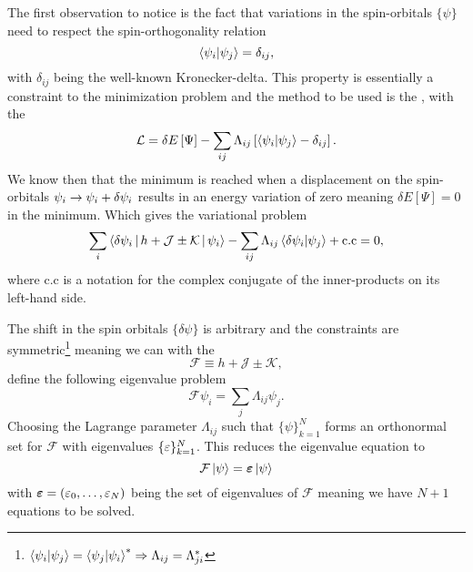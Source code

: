         The first observation to notice is the fact that variations in the
        spin-orbitals $\{\psi\}$ need to respect the spin-orthogonality
        relation
            \begin{equation}
                \braket{\psi_i}{\psi_j} = \delta_{ij},
            \end{equation}
        with $\delta_{ij}$ being the well-known Kronecker-delta. This property
        is essentially a constraint to the minimization problem and the method
        to be used is the  \cite{linalgDavid},
        with the 
            \begin{equation}
                \mathcal{L} = \delta E\left[\Psi\right] -
                \sum_{ij}\Lambda_{ij}\left[\braket{\psi_i}{\psi_j} -
                \delta_{ij}\right].
            \end{equation}
        We know then that the minimum is reached when a displacement on the
        spin-orbitals $\psi_i\rightarrow\psi_i+\delta \psi_i$ results in an energy
        variation of zero meaning $\delta E\left[\Psi\right]=0$ in the minimum.
        Which gives the variational problem 
            \begin{equation}
                \sum_i \Braket{\delta\psi_i | h + \mathcal{J} \pm \mathcal{K} |
                \psi_i} - \sum_{ij} \Lambda_{ij}\braket{\delta\psi_i}{\psi_j} +
                \text{c.c} = 0,
            \end{equation}
        where $\text{c.c}$ is a notation for the complex conjugate of the
        inner-products on its left-hand side.

        The shift in the spin orbitals $\{\delta \psi\}$ is arbitrary and the
        constraints are
        symmetric\footnote{$\braket{\psi_i}{\psi_j}=\braket{\psi_j}{\psi_i}^{*}
        \Rightarrow \Lambda_{ij}=\Lambda^{*}_{ji}$} meaning we can with the
            \begin{equation}
                \mathcal{F} \equiv h + \mathcal{J} \pm \mathcal{K},
            \end{equation}
        define the following eigenvalue problem
            \begin{equation}
                \mathcal{F}\psi_i = \sum_j\Lambda_{ij}\psi_j.
            \end{equation}
        Choosing the Lagrange parameter $\Lambda_{ij}$ such that
        $\{\psi\}^N_{k=1}$ forms an orthonormal set for $\mathcal{F}$ with
        eigenvalues $\{\varepsilon\}^N_{k=1}$. This reduces the eigenvalue equation
        to
            \begin{equation}
                \mathcal{F}\ket{\psi} = \boldsymbol{{\varepsilon}}\ket{\psi}
                \label{eq:HFequations}
            \end{equation}
        with $\boldsymbol{{\varepsilon}}=(\varepsilon_0,\dots,\varepsilon_N)$ being the set of
        eigenvalues of $\mathcal{F}$ meaning we have $N+1$ equations to be
        solved.

